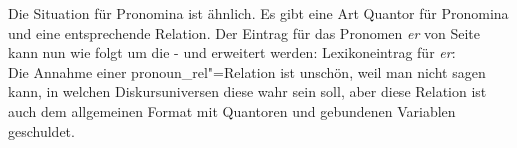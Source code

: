 Die Situation für Pronomina ist ähnlich. Es gibt eine Art Quantor für Pronomina und eine
entsprechende Relation. Der Eintrag für das Pronomen \emph{er} von Seite~\pageref{le-er} kann nun wie folgt um die \rels- und \hconswe
erweitert werden:
\eas
Lexikoneintrag für \emph{er}:\\
\zs
Die Annahme einer pronoun\_rel"=Relation ist unschön, weil man nicht sagen kann, in welchen
Diskursuniversen diese wahr sein soll, aber diese Relation ist auch dem allgemeinen Format mit
Quantoren und gebundenen Variablen geschuldet.


